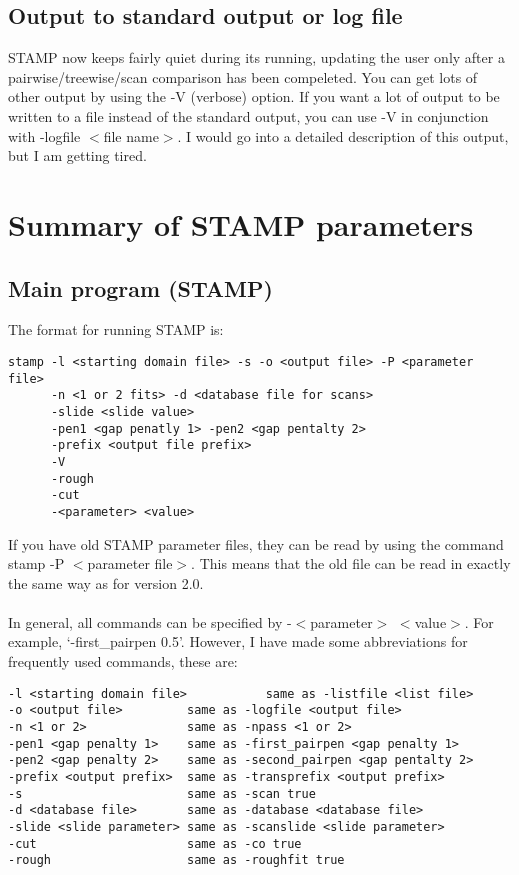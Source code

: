 \section{Output to standard output or log file}

STAMP now keeps fairly quiet during its running, updating the user only
after a pairwise/treewise/scan comparison has been compeleted.  You can
get lots of other output by using the -V (verbose) option.  If you want a lot of
output to be written to a file instead of the standard output, you 
can use -V in conjunction with -logfile $<$file name$>$.   I would go into
a detailed description of this output, but I am getting tired.

\chapter{Summary of STAMP parameters}

\section{Main program (STAMP)}

The format for running STAMP is:

\begin{scriptsize}\begin{verbatim}
stamp -l <starting domain file> -s -o <output file> -P <parameter file>
      -n <1 or 2 fits> -d <database file for scans> 
      -slide <slide value>
      -pen1 <gap penatly 1> -pen2 <gap pentalty 2> 
      -prefix <output file prefix>
      -V
      -rough 
      -cut
      -<parameter> <value>
\end{verbatim} \end{scriptsize}

If you have old STAMP parameter files, they can be read by using
the command stamp -P $<$parameter file$>$.  This means that the old
file can be read in exactly the same way as for version 2.0.\\
\\
In general, all commands can be specified by -$<$parameter$>$ $<$value$>$.
For example, `-first\_pairpen 0.5'.  However, I have made some
abbreviations for frequently used commands, these are:

\begin{scriptsize}\begin{verbatim}
-l <starting domain file>           same as -listfile <list file>
-o <output file>         same as -logfile <output file>
-n <1 or 2>              same as -npass <1 or 2>
-pen1 <gap penalty 1>    same as -first_pairpen <gap penalty 1>
-pen2 <gap penalty 2>    same as -second_pairpen <gap pentalty 2>
-prefix <output prefix>  same as -transprefix <output prefix>
-s                       same as -scan true
-d <database file>       same as -database <database file>
-slide <slide parameter> same as -scanslide <slide parameter>
-cut                     same as -co true 
-rough                   same as -roughfit true
\end{verbatim} \end{scriptsize}

